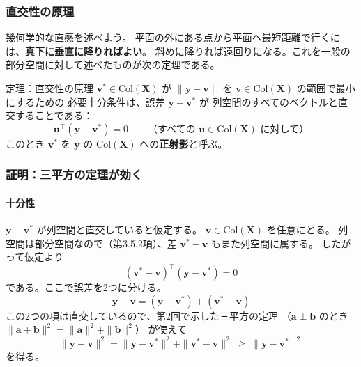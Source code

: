 \subsubsection{直交性の原理}

幾何学的な直感を述べよう。
平面の外にある点から平面へ最短距離で行くには、\textbf{真下に垂直に降りればよい}。
斜めに降りれば遠回りになる。これを一般の部分空間に対して述べたものが次の定理である。

\begin{itembox}[l]{定理：直交性の原理}
$\bm{v}^* \in \mathrm{Col}(\bm{X})$ が
$\|\bm{y} - \bm{v}\|$ を $\bm{v} \in \mathrm{Col}(\bm{X})$ の範囲で最小にするための
必要十分条件は、誤差 $\bm{y} - \bm{v}^*$ が
列空間のすべてのベクトルと直交することである：
\begin{equation}
  \bm{u}^\top (\bm{y} - \bm{v}^*) = 0
  \qquad \text{（すべての } \bm{u} \in \mathrm{Col}(\bm{X}) \text{ に対して）}
  \label{eq:ch4-orth}
\end{equation}
このとき $\bm{v}^*$ を $\bm{y}$ の $\mathrm{Col}(\bm{X})$ への\textbf{正射影}と呼ぶ。
\end{itembox}

\subsubsection{証明：三平方の定理が効く}

\paragraph{十分性}
$\bm{y} - \bm{v}^*$ が列空間と直交していると仮定する。
$\bm{v} \in \mathrm{Col}(\bm{X})$ を任意にとる。
列空間は部分空間なので（第3.5.2項）、差 $\bm{v}^* - \bm{v}$ もまた列空間に属する。
したがって仮定より
\begin{equation*}
  (\bm{v}^* - \bm{v})^\top (\bm{y} - \bm{v}^*) = 0
\end{equation*}
である。ここで誤差を2つに分ける。
\begin{equation*}
  \bm{y} - \bm{v} = (\bm{y} - \bm{v}^*) + (\bm{v}^* - \bm{v})
\end{equation*}
この2つの項は直交しているので、第2回で示した三平方の定理
（$\bm{a} \perp \bm{b}$ のとき $\|\bm{a}+\bm{b}\|^2 = \|\bm{a}\|^2 + \|\bm{b}\|^2$）
が使えて
\begin{equation}
  \|\bm{y} - \bm{v}\|^2
  = \|\bm{y} - \bm{v}^*\|^2 + \|\bm{v}^* - \bm{v}\|^2
  \;\geq\; \|\bm{y} - \bm{v}^*\|^2
  \label{eq:ch4-pythagoras}
\end{equation}
を得る。

